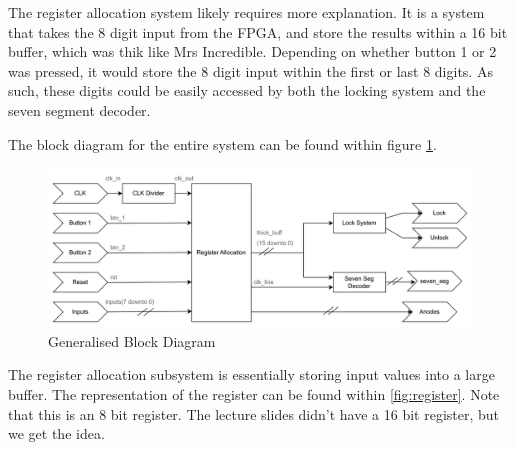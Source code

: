 \documentclass[12pt,a4paper]{article}
\begin{document}
The register allocation system likely requires more explanation. It is a system that takes the 8 digit input from the FPGA, and store the results within a 16 bit buffer, which was thik like Mrs Incredible. Depending on whether button 1 or 2 was pressed, it would store the 8 digit input within the first or last 8  digits. As such, these digits could be easily accessed by both the locking system and the seven segment decoder. 

The block diagram for the entire system can be found within figure \ref{fig:block_diagram}.

\begin{figure}[H]
    \centering
    \includegraphics[scale=0.25]{images/block.png}
    \caption{Generalised Block Diagram}
    \label{fig:block_diagram}
\end{figure}

The register allocation subsystem is essentially storing input values into a large buffer. The representation of the register can be found within \ref{fig:register}. Note that this is an 8 bit register. The lecture slides didn't have a 16 bit register, but we get the idea.
\end{document}
